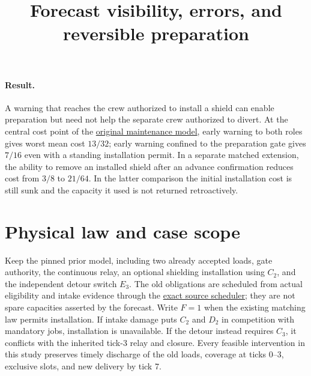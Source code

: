 \documentclass[11pt]{article}
\title{Forecast visibility, errors, and reversible preparation}
\date{}
\begin{document}
\maketitle

\paragraph{Result.}
A warning that reaches the crew authorized to install a shield can enable
preparation but need not help the separate crew authorized to divert.
At the central cost point of the \href{https://github.com/eternal-november/eos-research-programmes/pull/355}{original maintenance model}, early warning to both roles gives worst mean cost $13/32$;
early warning confined to the preparation gate gives $7/16$ even with
a standing installation permit. In a separate matched extension,
the ability to remove an installed shield after an advance confirmation
reduces cost from $3/8$ to $21/64$. In the latter comparison the initial
installation cost is still sunk and the capacity it used is not returned
retroactively.

\section{Physical law and case scope}
Keep the pinned prior model, including two already accepted loads, gate
authority, the continuous relay, an optional shielding installation using
$C_2$, and the independent detour switch $E_3$. The old obligations are
scheduled from actual eligibility and intake evidence through the
\href{https://github.com/eternal-november/eos-research-programmes/pull/353}{exact source scheduler}; they are not spare
capacities asserted by the forecast. Write $F=1$ when the existing
matching law permits installation. If intake damage puts $C_2$ and
$D_2$ in competition with mandatory jobs, installation is unavailable.
If the detour instead requires $C_3$, it conflicts with the inherited
tick-3 relay and closure. Every feasible intervention in this study
preserves timely discharge of the old loads, coverage at ticks 0--3,
exclusive slots, and new delivery by tick 7.
\end{document}
